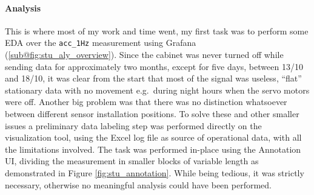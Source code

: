 \paragraph{Analysis}
This is where most of my work and time went, my first task was to perform some \acl{EDA} over the \texttt{acc\_1Hz} measurement using Grafana (\ref{sub@fig:stu_aly_overview}).
Since the cabinet was never turned off while sending data for approximately two months, except for five days, between 13/10 and 18/10, it was clear from the start that most of 
the signal was useless, ``flat'' stationary data with no movement e.g.\ during night hours when the servo motors were off. 
Another big problem was that there was no distinction whatsoever between different sensor installation positions.
To solve these and other smaller issues a preliminary data labeling step was performed directly on the visualization tool, using the Excel log file as source of 
operational data, with all the limitations involved. The task was performed in-place using the Annotation UI, dividing the measurement in smaller blocks of variable length 
as demonstrated in Figure \ref{fig:stu_annotation}. While being tedious, it was strictly necessary, otherwise no meaningful analysis could have been performed.


